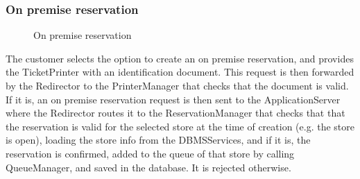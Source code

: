 \subsubsection{On premise reservation}
\begin{figure}[H]
	\noindent
	\caption{On premise reservation}
\end{figure}
The customer selects the option to create an on premise reservation, and provides the TicketPrinter with an identification document. This request is then forwarded by the Redirector to the PrinterManager that checks that the document is valid. If it is, an on premise reservation request is then sent to the ApplicationServer where the Redirector routes it to the ReservationManager that checks that that the reservation is valid for the selected store at the time of creation (e.g. the store is open), loading the store info from the DBMSServices, and if it is, the reservation is confirmed, added to the queue of that store by calling QueueManager, and saved in the database. It is rejected otherwise.
